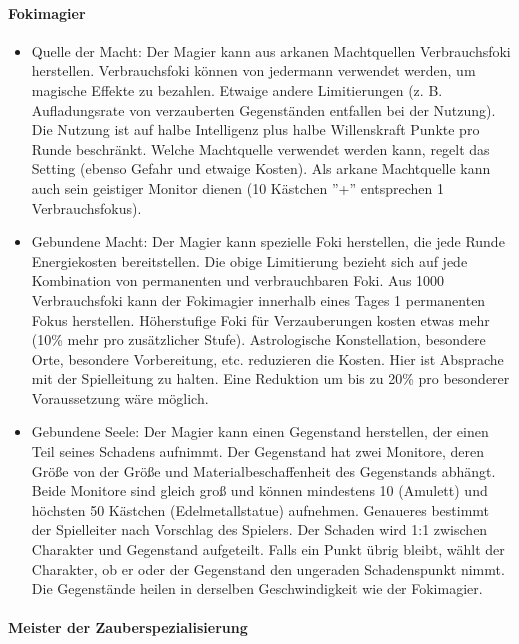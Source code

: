 \documentclass{article}
\begin{document}
\paragraph{Fokimagier}

\begin{itemize}
\item Quelle der Macht: Der Magier kann aus arkanen Machtquellen Verbrauchsfoki herstellen. Verbrauchsfoki können von jedermann verwendet werden, um magische Effekte zu bezahlen. Etwaige andere Limitierungen (z. B. Aufladungsrate von verzauberten Gegenständen entfallen bei der Nutzung). Die Nutzung ist auf halbe Intelligenz plus halbe Willenskraft Punkte pro Runde beschränkt. Welche Machtquelle verwendet werden kann, regelt das Setting (ebenso Gefahr und etwaige Kosten). Als arkane Machtquelle kann auch sein geistiger Monitor dienen (10 Kästchen ''+'' entsprechen 1 Verbrauchsfokus).
\item Gebundene Macht: Der Magier kann spezielle Foki herstellen, die jede Runde Energiekosten bereitstellen. Die obige Limitierung bezieht sich auf jede Kombination von permanenten und verbrauchbaren Foki. Aus 1000 Verbrauchsfoki kann der Fokimagier innerhalb eines Tages 1 permanenten Fokus herstellen. Höherstufige Foki für Verzauberungen kosten etwas mehr (10\% mehr pro zusätzlicher Stufe). Astrologische Konstellation, besondere Orte, besondere Vorbereitung, etc. reduzieren die Kosten. Hier ist Absprache mit der Spielleitung zu halten. Eine Reduktion um bis zu 20\% pro besonderer Voraussetzung wäre möglich.
\item Gebundene Seele: Der Magier kann einen Gegenstand herstellen, der einen Teil seines Schadens aufnimmt. Der Gegenstand hat zwei Monitore, deren Größe von der Größe und Materialbeschaffenheit des Gegenstands abhängt. Beide Monitore sind gleich groß und können mindestens 10 (Amulett) und höchsten 50 Kästchen (Edelmetallstatue) aufnehmen. Genaueres bestimmt der Spielleiter nach Vorschlag des Spielers. Der Schaden wird 1:1 zwischen Charakter und Gegenstand aufgeteilt. Falls ein Punkt übrig bleibt, wählt der Charakter, ob er oder der Gegenstand den ungeraden Schadenspunkt nimmt. Die Gegenstände heilen in derselben Geschwindigkeit wie der Fokimagier.
\end{itemize}

\paragraph{Meister der Zauberspezialisierung}
\end{document}

